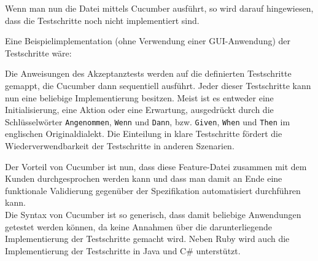 Wenn man nun die Datei mittels Cucumber ausführt, so wird darauf hingewiesen, dass die Testschritte noch nicht implementiert sind.

Eine Beispielimplementation (ohne Verwendung einer GUI-Anwendung) der Testschritte wäre:
\begin{ruby}[label=features/step\_definitions/steps.rb]
   
     

  
    

  
    

\end{ruby}
Die Anweisungen des Akzeptanztests werden auf die definierten Testschritte gemappt, die Cucumber dann sequentiell ausführt.
Jeder dieser Testschritte kann nun eine beliebige Implementierung besitzen. Meist ist es entweder eine Initialisierung, eine Aktion oder eine Erwartung, ausgedrückt durch die Schlüsselwörter \texttt{Angenommen}, \texttt{Wenn} und \texttt{Dann}, bzw. \texttt{Given}, \texttt{When} und \texttt{Then} im englischen Originaldialekt. Die Einteilung in klare Testschritte fördert die Wiederverwendbarkeit der Testschritte in anderen Szenarien.

Der Vorteil von Cucumber ist nun, dass diese Feature-Datei zusammen mit dem Kunden durchgesprochen werden kann und dass man damit an Ende eine funktionale Validierung gegenüber der Spezifikation automatisiert durchführen kann. \\
Die Syntax von Cucumber ist so generisch, dass damit beliebige Anwendungen getestet werden können, da keine Annahmen über die darunterliegende Implementierung der Testschritte gemacht wird.
Neben Ruby wird auch die Implementierung der Testschritte in Java und C\# unterstützt.

